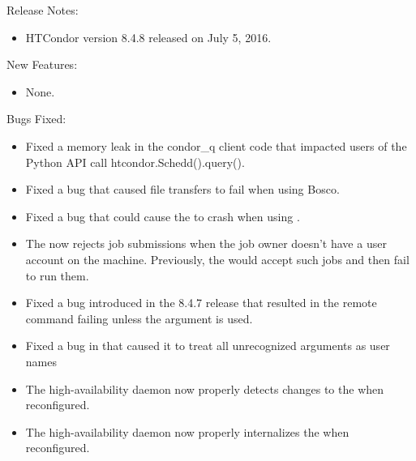 \noindent Release Notes:

\begin{itemize}

\item HTCondor version 8.4.8 released on July 5, 2016.

\end{itemize}


\noindent New Features:

\begin{itemize}

\item None.

\end{itemize}

\noindent Bugs Fixed:

\begin{itemize}

\item Fixed a memory leak in the condor\_q client code that impacted
users of the Python API call htcondor.Schedd().query().

\item Fixed a bug that caused file transfers to fail when using Bosco.

\item Fixed a bug that could cause the  to crash when using
.

\item The  now rejects job submissions when the job owner
doesn't have a user account on the machine.
Previously, the  would accept such jobs and then fail
to run them.

\item Fixed a bug introduced in the 8.4.7 release that resulted in the remote
 command failing unless the  argument is used.

\item Fixed a bug in  that caused it to treat all unrecognized arguments
as user names

\item The high-availability daemon now properly detects changes to the
 when reconfigured.

\item The high-availability daemon now properly internalizes the
 when reconfigured.


\end{itemize}

